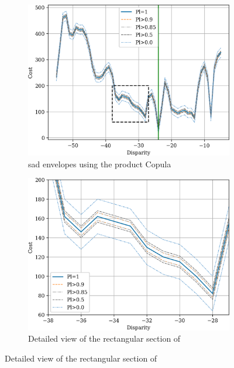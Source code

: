 \begin{figure}
    \centering
    \begin{subfigure}[t]{0.48\linewidth}
        \centering
        \includegraphics[width=\linewidth]{Images/Chap_4/bel_independence_100_120.png}
        \caption{\acrshort{sad} envelopes using the product Copula}
        \label{fig:belief_independence}
    \end{subfigure}\hfill
    \begin{subfigure}[t]{0.48\linewidth}
        \centering
        \includegraphics[width=\linewidth]{Images/Chap_4/bel_independence_100_120_zoom.png}
        \caption{Detailed view of the rectangular section of }
        \label{fig:belief_independence_zoom}

\end{subfigure}
\end{figure}

